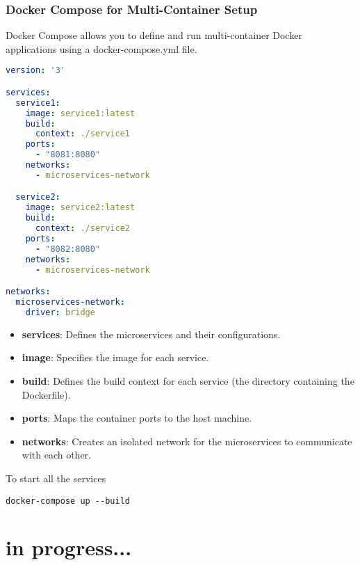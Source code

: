 \documentclass[a4paper, 12pt]{article}
\begin{document}
    \subsubsection{Docker Compose for Multi-Container Setup}
    Docker Compose allows you to define and run multi-container Docker applications using a docker-compose.yml file.

    \begin{lstlisting}[language=yaml]
version: '3'

services:
  service1:
    image: service1:latest
    build:
      context: ./service1
    ports:
      - "8081:8080"
    networks:
      - microservices-network

  service2:
    image: service2:latest
    build:
      context: ./service2
    ports:
      - "8082:8080"
    networks:
      - microservices-network

networks:
  microservices-network:
    driver: bridge

    \end{lstlisting}
    \begin{itemize}
        \item \textbf{services}: Defines the microservices and their configurations.
        \item \textbf{image}: Specifies the image for each service.
        \item \textbf{build}: Defines the build context for each service (the directory containing the Dockerfile).
        \item \textbf{ports}: Maps the container ports to the host machine.
        \item \textbf{networks}: Creates an isolated network for the microservices to communicate with each other.
    \end{itemize}
    To start all the services
    \begin{lstlisting}
docker-compose up --build
    \end{lstlisting}


    \section{in progress...}
\end{document}
